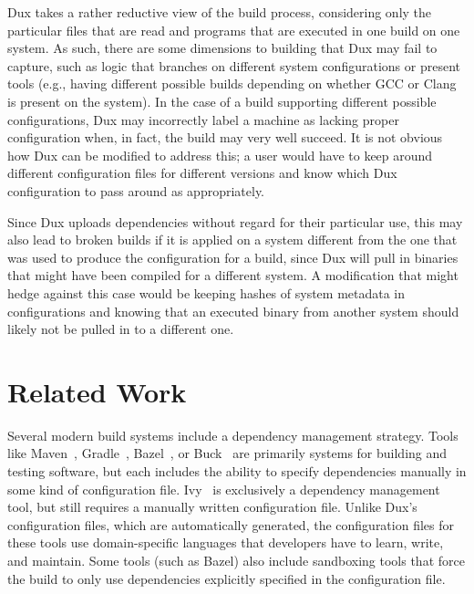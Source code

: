 \documentclass[10pt,conference]{IEEEtran}
\begin{document}
Dux takes a rather reductive view of the build process, considering only the particular files that are read
and programs that are executed in one build on one system. As such, there are some dimensions to building that
Dux may fail to capture, such as logic that branches on different system configurations or present tools (e.g.,
having different possible builds depending on whether GCC or Clang is present on the system). In the case of
a build supporting different possible configurations, Dux may incorrectly label a machine as lacking proper
configuration when, in fact, the build may very well succeed. It is not obvious how Dux can be modified to address
this; a user would have to keep around different configuration files for different versions and know which
Dux configuration to pass around as appropriately.

Since Dux uploads dependencies without regard for their particular use, this may also lead to broken builds 
if it is applied on a system different from the one that was used to produce the configuration for a build, 
since Dux will pull in binaries that might have been compiled for a different system. A modification that
might hedge against this case would be keeping hashes of system metadata in configurations and knowing
that an executed binary from another system should likely not be pulled in to a different one.

\section{Related Work}

Several modern build systems include a dependency management strategy. Tools like
Maven~\cite{Maven}, Gradle~\cite{Gradle}, Bazel~\cite{blaze}, or Buck~\cite{buck}
are primarily systems for building and testing software, but each includes the
ability to specify dependencies manually in some kind of configuration file.
Ivy~\cite{Ivy} is exclusively a dependency management tool, but still requires
a manually written configuration file.
Unlike Dux's configuration files, which are automatically generated, the configuration
files for these tools use domain-specific languages that developers have to learn,
write, and maintain. Some tools (such as Bazel) also include sandboxing tools
that force the build to only use dependencies explicitly specified in the
configuration file.
\end{document}
